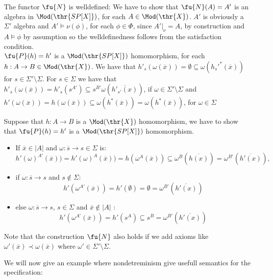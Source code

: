 \begin{PROOF}
The functor $\fu{N}$ is welldefined:
We have to show that $\fu{N}(A)=A'$ is an algebra in $\Mod(\thr{SP[X]})$, for each $A \in \Mod(\thr{X})$.
$A'$ is obviously a $\Sigma'$ algebra and $A' \models \nu(\phi)$, for each $\phi \in \Phi$, since $A'|_{\nu} = A$, by construction and $A \models \phi$ by assumption so the welldefinedness follows from the satisfaction condition.\\
$\fu{P}(h)=h'$ is a $\Mod(\thr{SP[X]})$ homomorphism, for each $h: A \to B \in \Mod(\thr{X})$. We have that $h'_s(\omega(\overline{x}))= \emptyset \subseteq \omega(h_s'^*(\overline{x}))$ for $s \in \Sigma' \setminus \Sigma$. For $s \in \Sigma$ we have that $h'_s(\omega(\overline{x}))= h'_s(s^{A'}) \subseteq s^{B'} \omega(\overline{h'_{s'}(x)})$, if $\omega \in \Sigma' \setminus \Sigma$ and $h'(\omega(\overline{x}))= h(\omega(\overline{x}))\subseteq \omega(h^*(\overline{x})) = \omega(h^*(\overline{x}))$, for $\omega \in \Sigma$

Suppose that $h:A \to B$ is a $\Mod(\thr{X})$ homomorphism, we have to show that $\fu{P}(h)=h'$ is a $\Mod(\thr{SP[X]})$ homomorphism.
	\begin{itemize}
	\item If $\overline{x} \in |A|$ and $\omega:\overline{s} \to s \in \Sigma$ is:
		\[ h'(\omega)^{A'}(\overline{x})) = h'(\omega)^A(\overline{x})) = h(\omega^A(\overline{x})) \subseteq \omega^B(\overline{h(x)}) = \omega^{B'}(\overline{h'(x)}), \]
	\item if $\omega:\overline{s} \to s$ and  $ s \not\in \Sigma$: 
	\[h'(\omega^{A'}(\overline{x})) = h'(\emptyset) = \emptyset = \omega^{B'}(\overline{h'(x)}) \]
	\item else $\omega:\overline{s} \to s$, $ s \in \Sigma$ and $\overline{x}  \not\in |A|$ : 
	\[h'(\omega^{A'}(\overline{x})) = h'(s^A) \subseteq s^B = \omega^{B'}(\overline{h'(x)}) \]
	\end{itemize}
\end{PROOF}
		
Note that the construction $\fu{N}$ also holds if we add axioms like $\omega'(\overline{x}) \prec \omega(\overline{x})$ where $\omega'\in \Sigma' \setminus \Sigma$.



We will now give an example where nondetreminism give usefull semantics for the specification:


